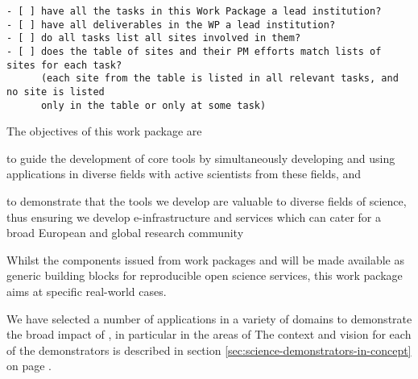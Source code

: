 \begin{draft}
\begin{verbatim}
- [ ] have all the tasks in this Work Package a lead institution?
- [ ] have all deliverables in the WP a lead institution?
- [ ] do all tasks list all sites involved in them?
- [ ] does the table of sites and their PM efforts match lists of sites for each task?
      (each site from the table is listed in all relevant tasks, and no site is listed
      only in the table or only at some task)
\end{verbatim}
\end{draft}

\begin{workpackage}[
  id=applications,
  wphases=0-36,
  swsites,
  title=Applications and use cases,
  short=Applications,
  lead=MP,
  SRLRM=9,
]


\begin{wpobjectives}
  The objectives of this work package are
 \begin{compactitem}
   \item to guide the development of core tools by simultaneously
     developing and using applications in diverse fields with active
     scientists from these fields, and
   \item to demonstrate that the tools we develop are valuable to diverse
     fields of science, thus ensuring we develop e-infrastructure and
     services which can cater for a broad European and global research community
   \end{compactitem}
\end{wpobjectives}

\begin{wpdescription}

  Whilst the components issued from work packages   and  will be
  made available as generic building blocks for reproducible open science services,
  this work package aims at specific real-world cases.

  We have selected a number of applications in a variety of domains
  to demonstrate the broad impact of \TheProject, in particular in the
  areas of 
  The context and vision for each of the demonstrators is described in
  section \ref{sec:science-demonstrators-in-concept} on page
  \pageref{sec:science-demonstrators-in-concept}.


\end{wpdescription}
\end{workpackage}

